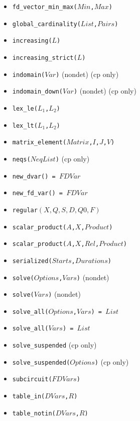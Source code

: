 \documentclass[10pt]{article}
\begin{document}
\begin{multicols}{2}
\begin{scriptsize}
\begin{itemize}
\item \texttt{fd\_vector\_min\_max($Min$,$Max$)}
\item \texttt{global\_cardinality($List$,$Pairs$)}
\item \texttt{increasing($L$)}
\item \texttt{increasing\_strict($L$)}
\item \texttt{indomain($Var$)} (nondet) (cp only)
\item \texttt{indomain\_down($Var$)} (nondet) (cp only)
\item \texttt{lex\_le($L_1$,$L_2$)}
\item \texttt{lex\_lt($L_1$,$L_2$)}
\item \texttt{matrix\_element($Matrix$,$I$,$J$,$V$)}
\item \texttt{neqs($NeqList$)} (cp only)
\item \texttt{new\_dvar() = $FDVar$}
\item \texttt{new\_fd\_var() = $FDVar$}
\item \texttt{regular$(X, Q, S, D, Q0, F)$}
\item \texttt{scalar\_product($A$,$X$,$Product$)} 
\item \texttt{scalar\_product($A$,$X$,$Rel$,$Product$)}
\item \texttt{serialized($Starts$,$Durations$)}
\item \texttt{solve($Options$,$Vars$)} (nondet)
\item \texttt{solve($Vars$)} (nondet)
\item \texttt{solve\_all($Options$,$Vars$) = $List$}
\item \texttt{solve\_all($Vars$) = $List$}
\item \texttt{solve\_suspended} (cp only)
\item \texttt{solve\_suspended($Options$)} (cp only)
\item \texttt{subcircuit($FDVars$)} 
\item \texttt{table\_in($DVars$,$R$)}
\item \texttt{table\_notin($DVars$,$R$)}
\end{itemize}
\end{scriptsize}


\end{multicols}
\end{document}
